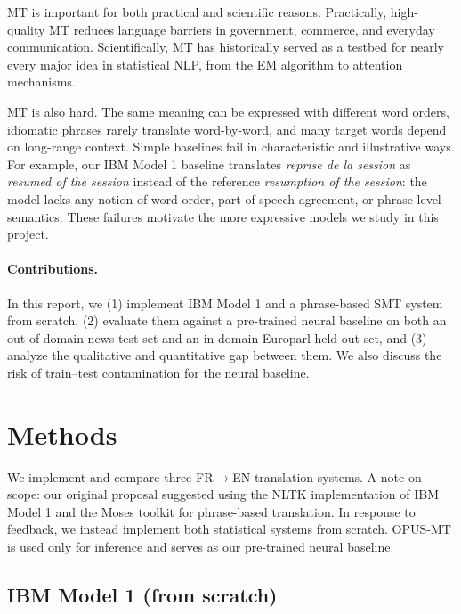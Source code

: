 \documentclass[11pt]{article}
\begin{document}
MT is important for both practical and scientific reasons. Practically, high-quality MT reduces language barriers in government, commerce, and everyday communication. Scientifically, MT has historically served as a testbed for nearly every major idea in statistical NLP, from the EM algorithm to attention mechanisms.
 
MT is also hard. The same meaning can be expressed with different word orders, idiomatic phrases rarely translate word-by-word, and many target words depend on long-range context. Simple baselines fail in characteristic and illustrative ways. For example, our IBM Model 1 baseline translates \emph{reprise de la session} as \emph{resumed of the session} instead of the reference \emph{resumption of the session}: the model lacks any notion of word order, part-of-speech agreement, or phrase-level semantics. These failures motivate the more expressive models we study in this project.
 
\paragraph{Contributions.} In this report, we (1) implement IBM Model 1 and a phrase-based SMT system from scratch, (2) evaluate them against a pre-trained neural baseline on both an out-of-domain news test set and an in-domain Europarl held-out set, and (3) analyze the qualitative and quantitative gap between them. We also discuss the risk of train--test contamination for the neural baseline.
 
\section{Methods}
\label{sec:methods}
 
We implement and compare three FR$\rightarrow$EN translation systems. A note on scope: our original proposal suggested using the NLTK implementation of IBM Model 1 and the Moses toolkit for phrase-based translation. In response to feedback, we instead implement both statistical systems from scratch. OPUS-MT is used only for inference and serves as our pre-trained neural baseline.
 
\subsection{IBM Model 1 (from scratch)}
\label{sec:ibm1}
 
\end{document}
